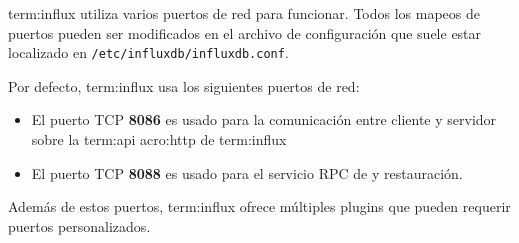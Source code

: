 \gls{term:influx} utiliza varios puertos de red para funcionar. Todos los
mapeos de puertos pueden ser modificados en el archivo de configuración que
suele estar localizado en \texttt{/etc/influxdb/influxdb.conf}.

Por defecto, \gls{term:influx} usa los siguientes puertos de red:

\begin{itemize}

  \item
  El puerto TCP \textbf{8086} es usado para la comunicación entre cliente y
  servidor sobre la \gls{term:api} \gls{acro:http} de \gls{term:influx}

  \item
    El puerto TCP \textbf{8088} es usado para el servicio RPC de  y
  restauración.

\end{itemize}

Además de estos puertos, \gls{term:influx} ofrece múltiples plugins que pueden
requerir puertos personalizados.
